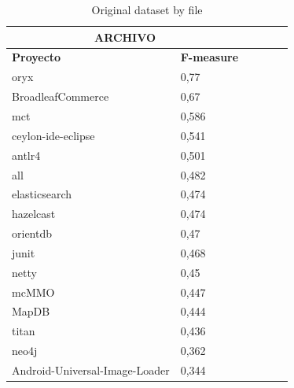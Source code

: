 \begin{table}[H]
\caption{\label{table:original_weka_file} Original dataset by file}
\begin{tabular}{llllll}
\hline
\multicolumn{2}{c}{\textbf{ARCHIVO}}                   \\
\hline
\textbf{Proyecto}               & \textbf{F-measure} \\
\hline
oryx                           & 0,77               \\
BroadleafCommerce              & 0,67               \\
mct                            & 0,586              \\
ceylon-ide-eclipse             & 0,541              \\
antlr4                         & 0,501              \\
all                            & 0,482              \\
elasticsearch                  & 0,474              \\
hazelcast                      & 0,474              \\
orientdb                       & 0,47               \\
junit                          & 0,468              \\
netty                          & 0,45               \\
mcMMO                          & 0,447              \\
MapDB                          & 0,444              \\
titan                          & 0,436              \\
neo4j                          & 0,362              \\
Android-Universal-Image-Loader & 0,344  
\end{tabular}
\end{table}